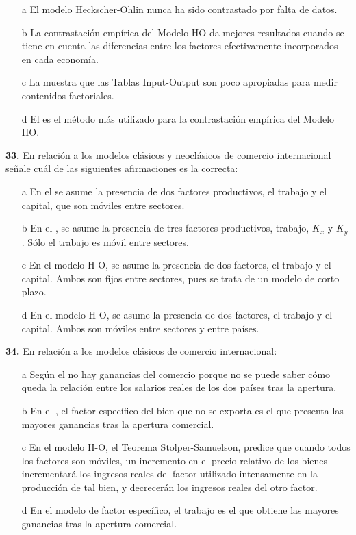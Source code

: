 \documentclass{nuevotema}
\begin{document}
\begin{enumerate}
	\item[a] El modelo Heckscher-Ohlin nunca ha sido contrastado por falta de datos.
	\item[b] La contrastación empírica del Modelo HO da mejores resultados cuando se tiene en cuenta las diferencias entre los factores efectivamente incorporados en cada economía.
	\item[c] La  muestra que las Tablas Input-Output son poco apropiadas para medir contenidos factoriales.
	\item[d] El  es el método más utilizado para la contrastación empírica del Modelo HO.
\end{enumerate}

\textbf{33.} En relación a los modelos clásicos y neoclásicos de comercio internacional señale cuál de las siguientes afirmaciones es la correcta:

\begin{enumerate}
	\item[a] En el  se asume la presencia de dos factores productivos, el trabajo y el capital, que son móviles entre sectores.
	\item[b] En el , se asume la presencia de tres factores productivos, trabajo, $K_x$ y $K_y$. Sólo el trabajo es móvil entre sectores.
	\item[c] En el modelo H-O, se asume la presencia de dos factores, el trabajo y el capital. Ambos son fijos entre sectores, pues se trata de un modelo de corto plazo.
	\item[d] En el modelo H-O, se asume la presencia de dos factores, el trabajo y el capital. Ambos son móviles entre sectores y entre países.
\end{enumerate}

\textbf{34.} En relación a los modelos clásicos de comercio internacional:
\begin{enumerate}
	\item[a] Según el  no hay ganancias del comercio porque no se puede saber cómo queda la relación entre los salarios reales de los dos países tras la apertura.
	\item[b] En el , el factor específico del bien que no se exporta es el que presenta las mayores ganancias tras la apertura comercial.
	\item[c] En el modelo H-O, el Teorema Stolper-Samuelson, predice que cuando todos los factores son móviles, un incremento en el precio relativo de los bienes incrementará los ingresos reales del factor utilizado intensamente en la producción de tal bien, y decrecerán los ingresos reales del otro factor.
	\item[d] En el modelo de factor específico, el trabajo es el que obtiene las mayores ganancias tras la apertura comercial.
\end{enumerate}
\end{document}
